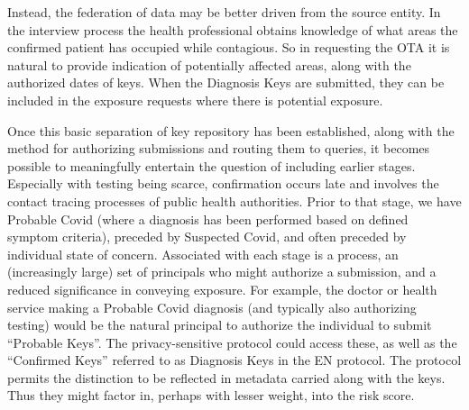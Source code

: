 Instead, the federation of data may be better driven from the source entity.  In the interview process the health professional obtains knowledge of what areas the confirmed patient has occupied while contagious.  So in requesting the OTA it is natural to provide indication of potentially affected areas, along with the authorized dates of keys.  When the Diagnosis Keys are submitted, they can be included in the exposure requests where there is potential exposure.

Once this basic separation of key repository has been established, along with the method for authorizing submissions and routing them to queries, it becomes possible to meaningfully entertain the question of including earlier stages.  Especially with testing being scarce, confirmation occurs late and involves the contact tracing processes of public health authorities. Prior to that stage, we have Probable Covid (where a diagnosis has been performed based on defined symptom criteria), preceded by Suspected Covid, and often preceded by individual state of concern.  Associated with each stage is a process, an (increasingly large) set of principals who might authorize a submission, and a reduced significance in conveying exposure. For example, the doctor or health service making a Probable Covid diagnosis (and typically also authorizing testing) would be the natural principal to authorize the individual to submit “Probable Keys”.  The privacy-sensitive protocol could access these, as well as the “Confirmed Keys” referred to as Diagnosis Keys in the EN protocol.  The protocol permits the distinction to be reflected in metadata carried along with the keys.  Thus they might factor in, perhaps with lesser weight, into the risk score.
\fi




